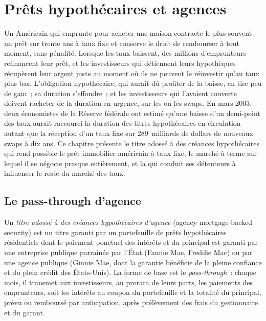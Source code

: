 \chapter{Prêts hypothécaires et agences}\label{ch:m2:mortgages-and-agencies}

Un Américain qui emprunte pour acheter une maison contracte le plus souvent un prêt sur trente ans
à taux fixe et conserve le droit de rembourser à tout moment, sans pénalité. Lorsque les taux
baissent, des millions d'emprunteurs refinancent leur prêt, et les investisseurs qui détiennent
leurs hypothèques récupèrent leur argent juste au moment où ils ne peuvent le réinvestir qu'au
taux plus bas. L'obligation hypothécaire, qui aurait dû profiter de la baisse, en tire peu de gain~;
sa duration s'effondre~; et les investisseurs qui l'avaient couverte doivent racheter de la
duration en urgence, sur les  ou les swaps. En mars 2003, deux économistes de la
Réserve fédérale ont estimé qu'une baisse d'un demi-point des taux aurait raccourci la duration
des titres hypothécaires en circulation autant que la réception d'un taux fixe sur 289~milliards
de dollars de nouveaux swaps à dix ans. Ce chapitre présente le titre adossé à des créances
hypothécaires qui rend possible le prêt immobilier américain à taux fixe, le marché à terme sur
lequel il se négocie presque entièrement, et la  qui conduit ses détenteurs à
influencer le reste du marché des taux.

\section{Le pass-through d'agence}

\begin{definition}\label{def:m2:mortgages-and-agencies:mbs}
Un \emph{titre adossé à des créances hypothécaires d'agence} (agency mortgage-backed security)
est un titre garanti par un portefeuille de prêts hypothécaires résidentiels dont le paiement ponctuel
des intérêts et du principal est garanti par une entreprise publique parrainée par l'État
(Fannie Mae, Freddie Mac) ou par une agence publique (Ginnie Mae, dont la garantie
bénéficie de la pleine confiance et du plein crédit des États-Unis). La forme de base est le
\emph{pass-through}~: chaque mois, il transmet aux investisseurs, au prorata
de leurs parts, les paiements des emprunteurs, soit les intérêts au coupon du portefeuille
et la totalité du principal, prévu ou remboursé par anticipation, après
prélèvement des frais du gestionnaire et du garant.
\end{definition}

